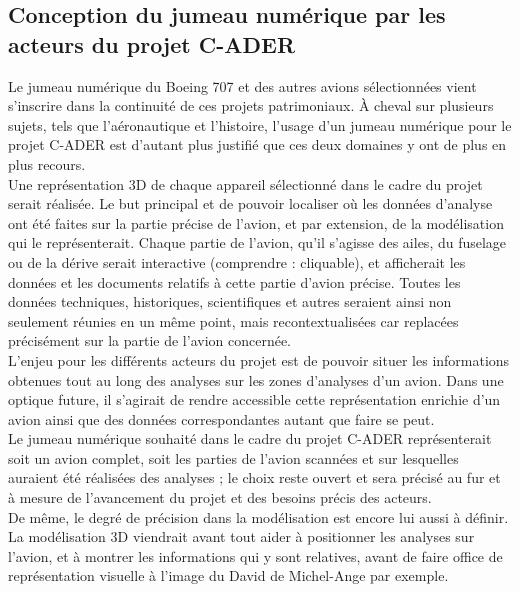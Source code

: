 	       \subsection{Conception du jumeau numérique par les acteurs du projet C-ADER }

Le jumeau numérique du Boeing 707 et des autres avions sélectionnées vient s’inscrire dans la continuité de ces projets patrimoniaux. À cheval sur plusieurs sujets, tels que l'aéronautique et l'histoire, l'usage d'un jumeau numérique pour le projet C-ADER est d'autant plus justifié que ces deux domaines y ont de plus en plus recours.\\

Une représentation 3D de chaque appareil sélectionné dans le cadre du projet serait réalisée. Le but principal et de pouvoir localiser où les données d'analyse ont été faites sur la partie précise de l'avion, et par extension, de la modélisation qui le représenterait. Chaque partie de l’avion, qu’il s’agisse des ailes, du fuselage ou de la dérive serait interactive (comprendre : cliquable), et afficherait les données et les documents relatifs à cette partie d'avion précise. Toutes les données techniques, historiques, scientifiques et autres seraient ainsi non seulement réunies en un même point, mais recontextualisées car replacées précisément sur la partie de l'avion concernée.\\ 

L'enjeu pour les différents acteurs du projet est de pouvoir situer les informations obtenues tout au long des analyses sur les zones d’analyses d’un avion. Dans une optique future, il s'agirait de rendre accessible cette représentation enrichie d'un avion ainsi que des données correspondantes autant que faire se peut.\\

Le jumeau numérique souhaité dans le cadre du projet C-ADER représenterait soit un avion complet, soit les parties de l’avion scannées et sur lesquelles auraient été réalisées des analyses ; le choix reste ouvert et sera précisé au fur et à mesure de l’avancement du projet et des besoins précis des acteurs.\\ 
             
De même, le degré de précision dans la modélisation est encore lui aussi à définir. La modélisation 3D viendrait avant tout aider à positionner les analyses sur l’avion, et à montrer les informations qui y sont relatives, avant de faire office de représentation visuelle à l’image du David de Michel-Ange par exemple.\\

